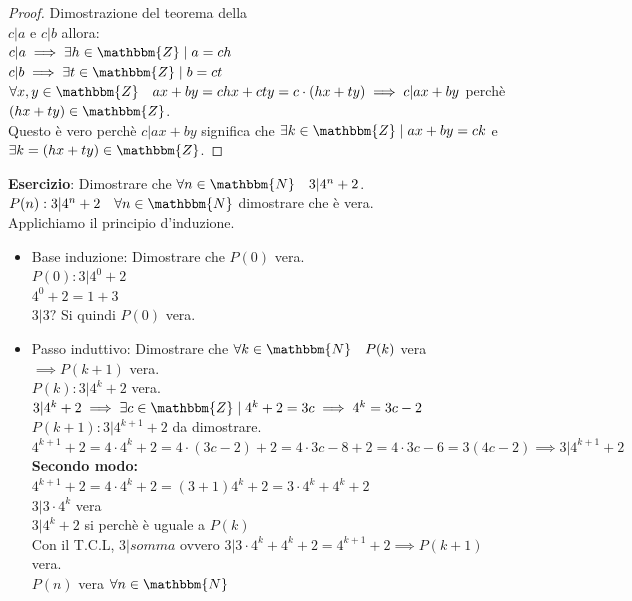 \documentclass[12pt, letterpaper]{report}
\newcommand{\namerefl}[1]{%
	\bgroup
	\let\nmu\MakeLowercase
	\nameref{#1}\egroup}
\newcommand{\nmu}{}
\begin{document}
		\begin{proof}{Dimostrazione del teorema della \namerefl{th:comb_lineare}} \quad \\
			$c|a$ e $c|b$ allora: \\
			$c|a \implies \exists h \in \mathbbm{Z} \mid a = ch$ \\
			$c|b \implies \exists t \in \mathbbm{Z} \mid b = ct$ \\
			$\forall x, y \in \mathbbm{Z} \quad ax + by = chx + cty = c \cdot (hx + ty) \implies c | ax + by$ perchè $(hx + ty) \in \mathbbm{Z}$. \\
			Questo è vero perchè $c|ax + by$ significa che $\exists k \in \mathbbm{Z} \mid ax + by = ck$ e $\exists k = (hx + ty) \in \mathbbm{Z}$.
		\end{proof}
		\textbf{Esercizio}: Dimostrare che $\forall n \in \mathbbm{N} \quad 3|4^n + 2$. \\
		$P(n): 3|4^n + 2 \quad \forall n \in \mathbbm{N}$ dimostrare che è vera. \\
		Applichiamo il principio d'induzione.
		\begin{itemize}
			\item Base induzione: Dimostrare che $P(0)$ vera. \\
			$P(0): 3|4^0 + 2$ \\
			$4^0 + 2 = 1 + 3$ \\
			$3|3?$ Si quindi $P(0)$ vera.
			\item Passo induttivo: Dimostrare che $\forall k \in \mathbbm{N} \quad P(k)$ vera $\implies P(k + 1)$ vera. \\
			$P(k): 3|4^k + 2$ vera. \\
			$3|4^k + 2 \implies \exists c \in \mathbbm{Z} \mid 4^k + 2 = 3c \implies4^k = 3c - 2$ \\
			$P(k + 1): 3|4^{k + 1} + 2$ da dimostrare. \\
			$4^{k + 1} + 2 = 4 \cdot 4^k + 2 = 4 \cdot (3c - 2) + 2 = 4 \cdot 3c - 8 + 2 = 4 \cdot 3c - 6 = 3(4c - 2) \implies 3|4^{k + 1} + 2$ \\
			\textbf{Secondo modo:} \\
			$4^{k+1}+2 = 4 \cdot 4^k + 2 = (3 + 1)4^k + 2 = 3 \cdot 4^k + 4^k + 2$ \\
			$3|3 \cdot 4^k$ vera \\
			$3|4^k + 2$ si perchè è uguale a $P(k)$ \\
			Con il T.C.L, $3|somma$ ovvero $3|3\cdot 4^k + 4^k + 2 = 4^{k + 1} + 2 \implies P(k + 1)$ vera. \\
			$P(n)$ vera $\forall n \in \mathbbm{N}$
		\end{itemize}
\end{document}
